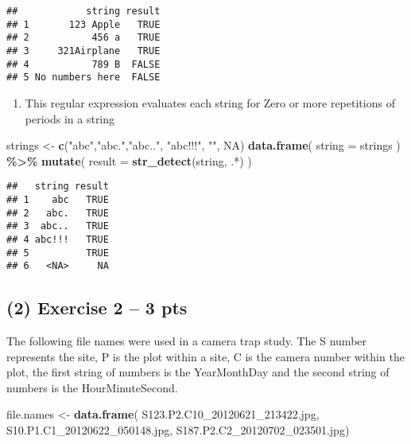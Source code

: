 \documentclass[
]{article}
\newenvironment{Shaded}{\begin{snugshade}}{\end{snugshade}}
\newcommand{\AttributeTok}[1]{\textcolor[rgb]{0.13,0.29,0.53}{#1}}
\newcommand{\ConstantTok}[1]{\textcolor[rgb]{0.56,0.35,0.01}{#1}}
\newcommand{\FunctionTok}[1]{\textcolor[rgb]{0.13,0.29,0.53}{\textbf{#1}}}
\newcommand{\NormalTok}[1]{#1}
\newcommand{\OtherTok}[1]{\textcolor[rgb]{0.56,0.35,0.01}{#1}}
\newcommand{\SpecialCharTok}[1]{\textcolor[rgb]{0.81,0.36,0.00}{\textbf{#1}}}
\newcommand{\StringTok}[1]{\textcolor[rgb]{0.31,0.60,0.02}{#1}}
\providecommand{\tightlist}{%
  \setlength{\itemsep}{0pt}\setlength{\parskip}{0pt}}
\begin{document}
\begin{verbatim}
##            string result
## 1       123 Apple   TRUE
## 2           456 a   TRUE
## 3     321Airplane   TRUE
## 4           789 B  FALSE
## 5 No numbers here  FALSE
\end{verbatim}

\begin{enumerate}
\def\labelenumi{\alph{enumi})}
\setcounter{enumi}{6}
\tightlist
\item
  This regular expression evaluates each string for Zero or more
  repetitions of periods in a string
\end{enumerate}

\begin{Shaded}
\begin{Highlighting}[]
\NormalTok{strings }\OtherTok{\textless{}{-}} \FunctionTok{c}\NormalTok{(}\StringTok{"abc"}\NormalTok{,}\StringTok{"abc."}\NormalTok{,}\StringTok{"abc.."}\NormalTok{, }\StringTok{"abc!!!"}\NormalTok{, }\StringTok{""}\NormalTok{, }\ConstantTok{NA}\NormalTok{)}
\FunctionTok{data.frame}\NormalTok{( }\AttributeTok{string =}\NormalTok{ strings ) }\SpecialCharTok{\%\textgreater{}\%}
  \FunctionTok{mutate}\NormalTok{( }\AttributeTok{result =} \FunctionTok{str\_detect}\NormalTok{(string, }\StringTok{\textquotesingle{}.*\textquotesingle{}}\NormalTok{) )}
\end{Highlighting}
\end{Shaded}

\begin{verbatim}
##   string result
## 1    abc   TRUE
## 2   abc.   TRUE
## 3  abc..   TRUE
## 4 abc!!!   TRUE
## 5          TRUE
## 6   <NA>     NA
\end{verbatim}

\hypertarget{exercise-2-3-pts}{%
\subsection{(2) Exercise 2 -- 3 pts}\label{exercise-2-3-pts}}

The following file names were used in a camera trap study. The S number
represents the site, P is the plot within a site, C is the camera number
within the plot, the first string of numbers is the YearMonthDay and the
second string of numbers is the HourMinuteSecond.

\begin{Shaded}
\begin{Highlighting}[]
\NormalTok{file.names }\OtherTok{\textless{}{-}} \FunctionTok{data.frame}\NormalTok{( }\StringTok{\textquotesingle{}S123.P2.C10\_20120621\_213422.jpg\textquotesingle{}}\NormalTok{,}
                 \StringTok{\textquotesingle{}S10.P1.C1\_20120622\_050148.jpg\textquotesingle{}}\NormalTok{,}
                 \StringTok{\textquotesingle{}S187.P2.C2\_20120702\_023501.jpg\textquotesingle{}}\NormalTok{)}
\end{Highlighting}
\end{Shaded}
\end{document}
